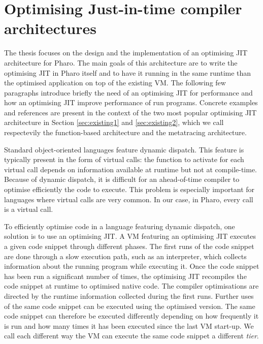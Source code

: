 \documentclass[a4paper,12pt,twoside]{../includes/ThesisStyle}
\begin{document}
\fi

\chapter{Optimising Just-in-time compiler architectures}
\label{chap:stateOfTheArt}
\minitoc

The thesis focuses on the design and the implementation of an optimising JIT architecture for Pharo. The main goals of this architecture are to write the optimising JIT in Pharo itself and to have it running in the same runtime than the optimised application on top of the existing VM. The following few paragraphs introduce briefly the need of an optimising JIT for performance and how an optimising JIT improve performance of run programs. Concrete examples and references are present in the context of the two most popular optimising JIT architecture in Section \ref{sec:existing1} and \ref{sec:existing2}, which we call respectevily the function-based architecture and the metatracing architecture.

Standard object-oriented languages feature dynamic dispatch. This feature is typically present in the form of virtual calls: the function to activate for each virtual call depends on information available at runtime but not at compile-time. Because of dynamic dispatch, it is difficult for an ahead-of-time compiler to optimise efficiently the code to execute. This problem is especially important for languages where virtual calls are very common. In our case, in Pharo, every call is a virtual call.

To efficiently optimise code in a language featuring dynamic dispatch, one solution is to use an optimising JIT. A VM featuring an optimising JIT executes a given code snippet through different phases. The first runs of the code snippet are done through a slow execution path, such as an interpreter, which collects information about the running program while executing it. Once the code snippet has been run a significant number of times, the optimising JIT recompiles the code snippet at runtime to optimised native code. The compiler optimisations are directed by the runtime information collected during the first runs. Further uses of the same code snippet can be executed using the optimised version. The same code snippet can therefore be executed differently depending on how frequently it is run and how many times it has been executed since the last VM start-up. We call each different way the VM can execute the same code snippet a different \emph{tier}.
\end{document}
